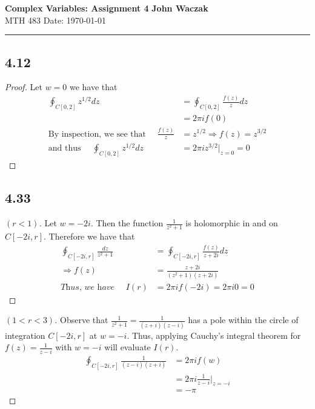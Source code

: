 \documentclass[a4paper, 11pt]{article}
\begin{document}
\noindent
\large\textbf{Complex Variables: Assignment 4} \hfill \textbf{John Waczak} \\
\normalsize MTH 483 \hfill  Date: \today \\
\par\noindent\rule{\textwidth}{0.4pt}

\subsection*{4.12} 
\begin{proof}
	Let $w=0$ we have that 
		\begin{align*}
			\oint_{C[0,2]}z^{1/2}dz &= \oint_{C[0,2]}\frac{f(z)}{z}dz \\ 
				&= 2\pi i f(0) \\ 
			\text{By inspection, we see that } \quad \frac{f(z)}{z} &= z^{1/2} \Rightarrow f(z) = z^{3/2} \\ 
			\text{and thus } \quad \oint_{C[0,2]}z^{1/2}dz &= 2\pi i z^{3/2}\Big|_{z=0} = 0
		\end{align*} 
\end{proof}
	
\subsection*{4.33} 
	\begin{proof}[$(r<1)$]
		Let $w=-2i$. Then the function $\frac{1}{z^2+1}$ is holomorphic in and on $C[-2i, r]$. Therefore we have that
			\begin{align*}
				\oint_{C[-2i, r]}\frac{dz}{z^2+1} &= \oint_{C[-2i, r]}\frac{f(z)}{z+2i}dz\\ 
				\Rightarrow f(z) &= \frac{z+2i}{(z^2+1)(z+2i)} \\ 
				\textit{Thus, we have } \quad I(r) &= 2\pi i f(-2i) = 2\pi i 0 = 0
			\end{align*}
	\end{proof}	
	
	\begin{proof}[$(1<r<3)$]
		Observe that $\frac{1}{z^2+1} = \frac{1}{(z+i)(z-i)}$ has a pole within the circle of integration $C[-2i, r]$ at $w=-i$. Thus, applying Cauchy's integral theorem for $f(z) = \frac{1}{z-i}$ with $w=-i$ will evaluate $I(r)$. 
			\begin{align*}
				\oint_{C[-2i, r]}\frac{1}{(z-i)(z+i)} &= 2\pi i f(w) \\ 
					&= 2\pi i \frac{1}{z-i}\big|_{z=-i} \\ 
					&= -\pi
			\end{align*}
	\end{proof}
	
\end{document}
